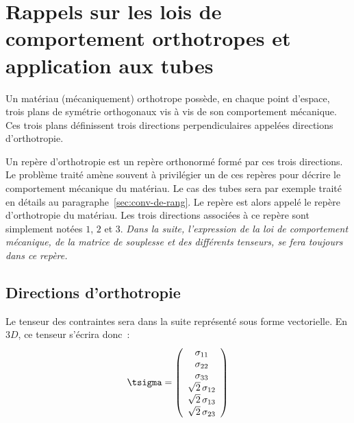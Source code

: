 
\section{Rappels sur les lois de comportement orthotropes et application
  aux tubes}
\label{sec:annexe:orthotropie}

Un matériau (mécaniquement) orthotrope possède, en chaque point
d'espace, trois plans de symétrie ortho\-gonaux vis à vis de son
comportement mécanique. Ces trois plans définissent trois directions
perpendiculaires appelées directions d'ortho\-tropie.

Un repère d'orthotropie est un repère orthonormé formé par ces trois
directions. Le problème traité amène souvent à privilégier un de ces
repères pour décrire le comportement mécanique du matériau. Le cas des
tubes sera par exemple traité en détails au
paragraphe~\ref{sec:conv-de-rang}. Le repère est alors appelé le repère
d'orthotropie du matériau. Les trois directions associées à ce repère
sont simplement notées \(1\), \(2\) et \(3\). {\em Dans la suite,
  l'expression de la loi de comportement mécanique, de la matrice de
  souplesse et des différents tenseurs, se fera toujours dans ce
  repère.}

\subsection{Directions d'orthotropie}
\label{sec:orthotropie}

Le tenseur des  contraintes sera dans la suite représenté sous forme
vectorielle. En \(3D\), ce tenseur s'écrira donc~:
\begin{equation}
  \label{eq:tsigma}
  \tsigma = \left(
    \begin{array}{c}
      \sigma_{11} \\
      \sigma_{22}  \\
      \sigma_{33}  \\
      \sqrt{2}\,\sigma_{12} \\
      \sqrt{2}\,\sigma_{13} \\
      \sqrt{2}\,\sigma_{23} \\
    \end{array}
  \right)
\end{equation}

